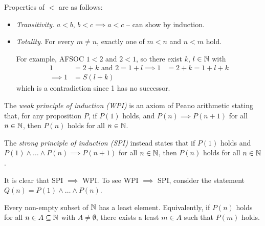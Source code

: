 \documentclass{../template/note}
\begin{document}
    Properties of \(<\) are as follows:

    \begin{itemize}
        \item \emph{Transitivity}. \(a < b\), \(b < c \implies a < c\) -- can show by induction.
        \item \emph{Totality}. For every \(m \neq n\), exactly one of \(m < n\) and \(n < m\) hold.
        
        For example, AFSOC \(1 < 2\) and \(2 < 1\), so there exist \(k\), \(l \in \mathbb N\) with
        \begin{align*}
            1 &= 2 + k \text{ and } 2 = 1 + l
            \implies 1 &= 2 + k = 1 + l + k \\
            \implies 1 &= S(l + k)
        \end{align*}
        which is a contradiction since 1 has no successor.
        
    \end{itemize}
    
    \begin{definition}
        The \emph{weak principle of induction (WPI)} is an axiom of Peano arithmetic stating that, for any proposition \(P\), if \(P(1)\) holds, and \(P(n) \implies P(n+1)\) for all \(n \in \mathbb N\), then \(P(n)\) holds for all \(n \in \mathbb N\).
    \end{definition}
    
    \begin{definition}
        The \emph{strong principle of induction (SPI)} instead states that if \(P(1)\) holds and \(P(1) \wedge \dots \wedge P(n) \implies P(n+1)\) for all \(n \in \mathbb N\), then \(P(n)\) holds for all \(n \in \mathbb N\).
    \end{definition}
    
    \begin{remark*}
        It is clear that SPI \(\implies\) WPI. To see WPI \(\implies\) SPI, consider the statement \(Q(n) = P(1) \wedge \dots \wedge P(n)\).
    \end{remark*}
    
    \begin{definition}
        Every non-empty subset of \(\mathbb N\) has a least element. Equivalently, if \(P(n)\) holds for all \(n \in A \subseteq \mathbb N\) with \(A \neq \emptyset\), there exists a least \(m \in A\) such that \(P(m)\) holds.
    \end{definition}
    
\end{document}
